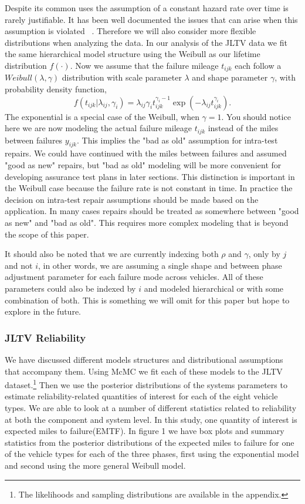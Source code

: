 \documentclass[12pt]{article}
\begin{document}
Despite its common uses the assumption of a constant hazard rate over time is
rarely justifiable.  It has been well documented the issues that can arise when
this assumption is violated ~\cite{ref3}.  Therefore we will also consider more
flexible distributions when analyzing the data.  In our analysis of the JLTV
data we fit the same hierarchical model structure using the Weibull as our
lifetime distribution $f(\cdot)$.  Now we assume that the failure mileage
$t_{ijk}$ each follow a $Weibull(\lambda, \gamma)$ distribution with scale
parameter $\lambda$ and shape parameter $\gamma$, with probability density
function,
\begin{equation*}
    f(t_{ijk}|\lambda_{ij},\gamma_{i})=\lambda_{ij}\gamma_{i}
    t_{ijk}^{\gamma_{i}-1}\exp(-\lambda_{ij} t_{ijk}^{\gamma_{i}}).
\end{equation*}
The exponential is a special case of the Weibull, when $\gamma = 1$.  You should
notice here we are now modeling the actual failure mileage $t_{ijk}$ instead of
the miles between failures $y_{ijk}$.  This implies the "bad as old" assumption
for intra-test repairs.  We could have continued with the miles between failures
and assumed "good as new" repairs, but "bad as old" modeling will be more
convenient for developing assurance test plans in later sections.  This
distinction is important in the Weibull case because the failure rate is not
constant in time. In practice the decision on intra-test repair assumptions
should be made based on the application.  In many cases repairs should be
treated as somewhere between "good as new" and "bad as old".  This requires more
complex modeling that is beyond the scope of this paper.

It should  also be noted that we are currently indexing both $\rho$ and
$\gamma$, only by $j$ and not $i$, in other words, we are assuming a single
shape and between phase adjustment parameter for each failure mode across
vehicles.  All of these parameters could also be indexed by $i$ and modeled
hierarchical or with some combination of both.  This is something we will omit
for this paper but hope to explore in the future.

\subsubsection{JLTV Reliability}
We have discussed different models structures and distributional assumptions
that accompany them.  Using McMC we fit each of these models to the JLTV
dataset.\footnote{The likelihoods and sampling distributions are available in the
appendix.} Then we use the posterior distributions of the systems parameters to
estimate reliability-related quantities of interest for each of the eight
vehicle types.  We are able to look at a number of different statistics related
to reliability at both the component and system level.  In this study, one
quantity of interest is expected miles to failure(EMTF).  In figure 1 we have box
plots and summary statistics from the posterior distributions of the expected
miles to failure for one of the vehicle types for each of the three phases,
first using the exponential model and second using the more general Weibull
model.
\end{document}
